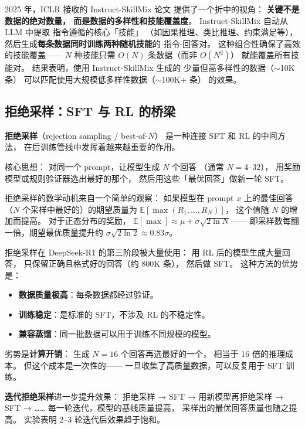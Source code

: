 
2025 年，ICLR 接收的 Instruct-SkillMix 论文
提供了一个折中的视角：
\textbf{关键不是数据的绝对数量，
而是数据的多样性和技能覆盖度}。
Instruct-SkillMix 自动从 LLM 中提取
指令遵循的核心「技能」
（如因果推理、类比推理、约束满足等），
然后生成\textbf{每条数据同时训练两种随机技能}的
指令-回答对。
这种组合性确保了高效的技能覆盖——
$N$ 种技能只需 $O(N)$ 条数据（而非 $O(N^2)$）
就能覆盖所有技能对。
结果表明，使用 Instruct-SkillMix 生成的
少量但高多样性的数据（$\sim$10K 条）
可以匹配使用大规模低多样性数据（$\sim$100K+ 条）
的效果。

\subsection{拒绝采样：SFT 与 RL 的桥梁}

\textbf{拒绝采样}（rejection sampling / best-of-$N$）
是一种连接 SFT 和 RL 的中间方法，
在后训练管线中发挥着越来越重要的作用。

核心思想：
对同一个 prompt，让模型生成 $N$ 个回答
（通常 $N = 4$--$32$），
用奖励模型或规则验证器选出最好的那个，
然后用这些「最优回答」做新一轮 SFT。

拒绝采样的数学动机来自一个简单的观察：
如果模型在 prompt $x$ 上的最佳回答
（$N$ 个采样中最好的）的期望质量为 $\mathbb{E}[\max(R_1, \ldots, R_N)]$，
这个值随 $N$ 的增加而提高。
对于正态分布的奖励，
$\mathbb{E}[\max] \approx \mu + \sigma \sqrt{2 \ln N}$——
即采样数每翻一倍，期望最优质量提升约 $\sigma \sqrt{2 \ln 2} \approx 0.83\sigma$。

拒绝采样在 DeepSeek-R1 的第三阶段被大量使用：
用 RL 后的模型生成大量回答，
只保留正确且格式好的回答（约 800K 条），
然后做 SFT。
这种方法的优势是：
\begin{itemize}[noitemsep]
  \item \textbf{数据质量极高}：每条数据都经过验证。
  \item \textbf{训练稳定}：是标准的 SFT，不涉及 RL 的不稳定性。
  \item \textbf{兼容蒸馏}：同一批数据可以用于训练不同规模的模型。
\end{itemize}

劣势是\textbf{计算开销}：
生成 $N = 16$ 个回答再选最好的一个，
相当于 16 倍的推理成本。
但这个成本是一次性的——
一旦收集了高质量数据，可以反复用于 SFT 训练。

\textbf{迭代拒绝采样}进一步提升效果：
拒绝采样 → SFT → 用新模型再拒绝采样 → SFT → ……
每一轮迭代，模型的基线质量提高，
采样出的最优回答质量也随之提高。
实验表明 2--3 轮迭代后效果趋于饱和。

